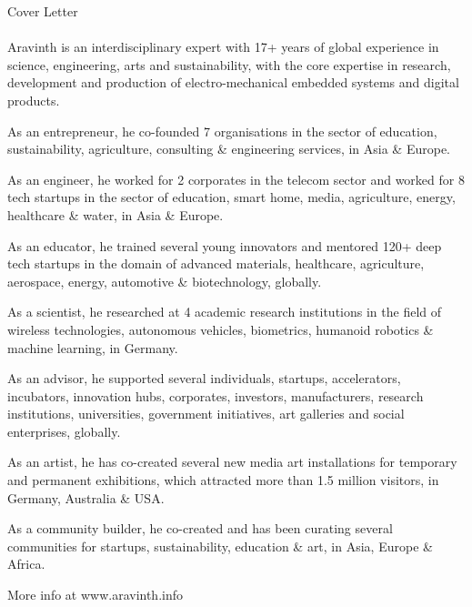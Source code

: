 \pagebreak
{
	\centering
	\Huge Cover Letter
	\par
}

\paragraph{}
Aravinth is an interdisciplinary expert with 17+ years of global experience in science, engineering, arts and sustainability, with the core expertise in research, development and production of electro-mechanical embedded systems and digital products.

As an entrepreneur, he co-founded 7 organisations in the sector of education, sustainability, agriculture, consulting \& engineering services, in Asia \& Europe.

As an engineer, he worked for 2 corporates in the telecom sector and worked for 8 tech startups in the sector of education, smart home, media, agriculture, energy, healthcare \& water, in Asia \& Europe.

As an educator, he trained several young innovators and mentored 120+ deep tech startups in the domain of advanced materials, healthcare, agriculture, aerospace, energy, automotive \& biotechnology, globally.

As a scientist, he researched at 4 academic research institutions in the field of wireless technologies, autonomous vehicles, biometrics, humanoid robotics \& machine learning, in Germany.

As an advisor, he supported several individuals, startups, accelerators, incubators, innovation hubs, corporates, investors, manufacturers, research institutions, universities, government initiatives, art galleries and social enterprises, globally.

As an artist, he has co-created several new media art installations for temporary and permanent exhibitions, which attracted more than 1.5 million visitors, in Germany, Australia \& USA.

As a community builder, he co-created and has been curating several communities for startups, sustainability, education \& art, in Asia, Europe \& Africa.

More info at www.aravinth.info

\clearpage
